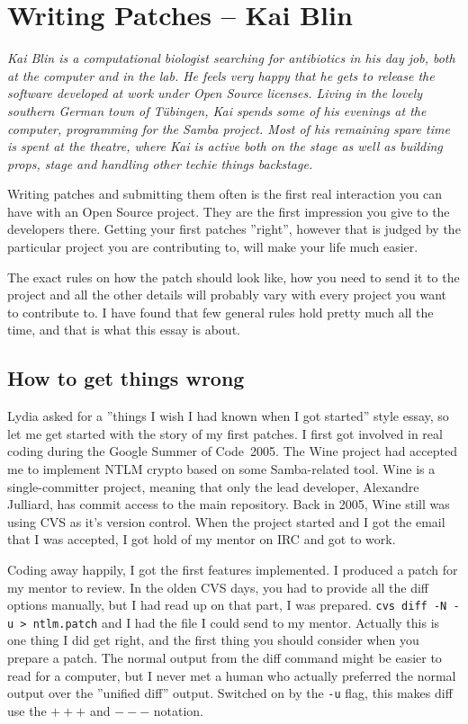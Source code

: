 \chapter{Writing Patches -- Kai Blin}

\textit{Kai Blin is a computational biologist searching for antibiotics in his
    day job, both at the computer and in the lab. He feels very happy that he
    gets to release the software developed at work under Open Source licenses.
    Living in the lovely southern German town of T\"ubingen, Kai spends some of
    his evenings at the computer, programming for the Samba project. Most of
    his remaining spare time is spent at the theatre, where Kai is active both
    on the stage as well as building props, stage and handling other techie
    things backstage.}

Writing patches and submitting them often is the first real interaction you can
have with an Open Source project. They are the first impression you give to the
developers there. Getting your first patches ''right'', however that is judged
by the particular project you are contributing to, will make your life much
easier.

The exact rules on how the patch should look like, how you need to send it to
the project and all the other details will probably vary with every project you
want to contribute to. I have found that few general rules hold pretty much all
the time, and that is what this essay is about.

\section*{How to get things wrong}

Lydia asked for a ''things I wish I had known when I got started'' style essay,
so let me get started with the story of my first patches. I first got involved
in real coding during the Google Summer of Code\texttrademark ~2005. The Wine
project had accepted me to implement NTLM crypto based on some Samba-related
tool. Wine is a single-committer project, meaning that only the lead developer,
Alexandre Julliard, has commit access to the main repository. Back in 2005, Wine
still was using CVS as it's version control. When the project started and I got
the email that I was accepted, I got hold of my mentor on IRC and got to work.

Coding away happily, I got the first features implemented. I produced a patch
for my mentor to review. In the olden CVS days, you had to provide all the diff
options manually, but I had read up on that part, I was prepared. \texttt{cvs
diff -N -u > ntlm.patch} and I had the file I could send to my mentor. Actually
this is one thing I did get right, and the first thing you should consider when
you prepare a patch. The normal output from the diff command might be easier to
read for a computer, but I never met a human who actually preferred the normal
output over the ''unified diff'' output. Switched on by the \texttt{-u} flag, this
makes diff use the \texttt{$+++$} and \texttt{$---$} notation. 

